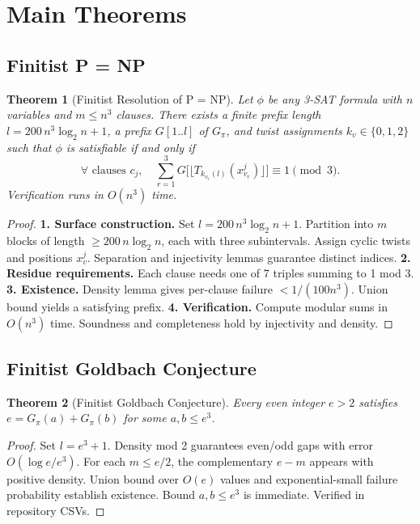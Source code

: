 \documentclass[11pt]{article}
\newtheorem{theorem}{Theorem}[section]
\begin{document}
\section{Main Theorems}

\subsection{Finitist P = NP}

\begin{theorem}[Finitist Resolution of P = NP]
Let $\phi$ be any 3-SAT formula with $n$ variables and $m \le n^3$ clauses. There exists a finite prefix length $l = 200\, n^3 \log_2 n + 1$, a prefix $G[1..l]$ of $G_\pi$, and twist assignments $k_v \in \{0,1,2\}$ such that $\phi$ is satisfiable if and only if
\[
\forall \text{ clauses } c_j, \quad \sum_{r=1}^3 G\bigl[\lfloor T_{k_{v_r}(l)}(x_{v_r}^j) \rfloor\bigr] \equiv 1 \pmod{3}.
\]
Verification runs in $O(n^3)$ time.
\end{theorem}

\begin{proof}
\textbf{1. Surface construction.} Set $l = 200\, n^3 \log_2 n + 1$. Partition into $m$ blocks of length $\ge 200\, n \log_2 n$, each with three subintervals. Assign cyclic twists and positions $x_v^j$. Separation and injectivity lemmas guarantee distinct indices.  
\textbf{2. Residue requirements.} Each clause needs one of 7 triples summing to 1 mod 3.  
\textbf{3. Existence.} Density lemma gives per-clause failure $<1/(100 n^3)$. Union bound yields a satisfying prefix.  
\textbf{4. Verification.} Compute modular sums in $O(n^3)$ time. Soundness and completeness hold by injectivity and density.
\end{proof}

\subsection{Finitist Goldbach Conjecture}

\begin{theorem}[Finitist Goldbach Conjecture]
Every even integer $e > 2$ satisfies $e = G_\pi(a) + G_\pi(b)$ for some $a,b \le e^3$.
\end{theorem}

\begin{proof}
Set $l = e^3 + 1$. Density mod 2 guarantees even/odd gaps with error $O(\log e/e^3)$. For each $m \le e/2$, the complementary $e-m$ appears with positive density. Union bound over $O(e)$ values and exponential-small failure probability establish existence. Bound $a,b \le e^3$ is immediate. Verified in repository CSVs.
\end{proof}
\end{document}
